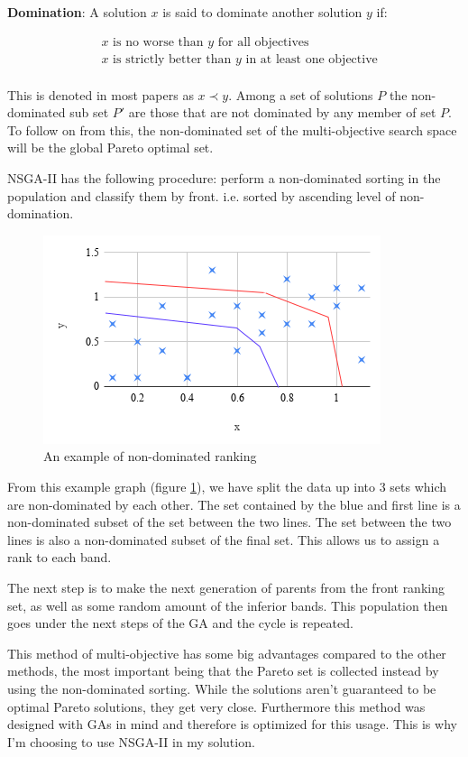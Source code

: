 \documentclass[11pt]{article}
\begin{document}
    \textbf{Domination}: A solution \(x\) is said to dominate another solution \(y\) if:

    \begin{align*}
        & x \text{ is no worse than } y \text{ for all objectives} \\
        & x \text{ is strictly better than } y \text{ in at least one objective} \\
    \end{align*}

    This is denoted in most papers as \(x \prec y\). Among a set of solutions \(P\)
    the non-dominated sub set \(P'\) are those that are not dominated by any member of
    set \(P\). To follow on from this, the non-dominated set of the multi-objective search
    space will be the global Pareto optimal set.

    NSGA-II has the following procedure: perform a non-dominated sorting in the population
    and classify them by front. i.e. sorted by ascending level of non-domination.

    \begin{figure}[H]
        \centering
        \includegraphics[width=.6\textwidth]{NSGArank}
        \caption{An example of non-dominated ranking}\label{fig:NSGArank}
    \end{figure}
    From this example graph (figure \ref{fig:NSGArank}), we have split the data up into 3 sets
    which are non-dominated
    by each other. The set contained by the blue and first line is a non-dominated subset
    of the set between the two lines. The set between the two lines is also a non-dominated
    subset of the final set. This allows us to assign a rank to each band.

    The next step is to make the next generation of parents from the front ranking
    set, as well as some random amount of the inferior bands. This population
    then goes under the next steps of the GA and the cycle is repeated.

    This method of multi-objective has some big advantages compared to the other methods,
    the most important being that the Pareto set is collected instead by using the non-dominated
    sorting. While the solutions aren't guaranteed to be optimal Pareto solutions, they
    get very close. Furthermore this method was designed with GAs in mind and therefore is
    optimized for this usage. This is why I'm choosing to use NSGA-II in my solution.
\end{document}

